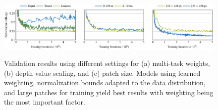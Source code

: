 \documentclass[lang=english]{tumarxivarticle}
\begin{document}
\begin{figure}
  \includegraphics{tikz/multidepth_arxiv-figure4}
  \vspace{-.5cm}

  \hspace{1cm}
  \begin{subfigure}[t]{4.95cm}
    \caption{}
    \label{subfig:ablation_mt}
  \end{subfigure}
  \hfill
  \begin{subfigure}[t]{4.95cm}
    \caption{}
    \label{subfig:ablation_scaling}
  \end{subfigure}
  \hfill
  \begin{subfigure}[t]{4.95cm}
    \caption{}
    \label{subfig:ablation_patchsize}
  \end{subfigure}
  \hspace{0.25mm}

  \vspace{-0.25cm} %
  \caption{Validation results using different settings for (a) multi-task weights, (b) depth value scaling, and (c) patch size. Models using learned weighting, normalization bounds adapted to the data distribution, and large patches for training yield best results with weighting being the most important factor.}
  \label{fig:ablation_studies}

\end{figure}
\end{document}
